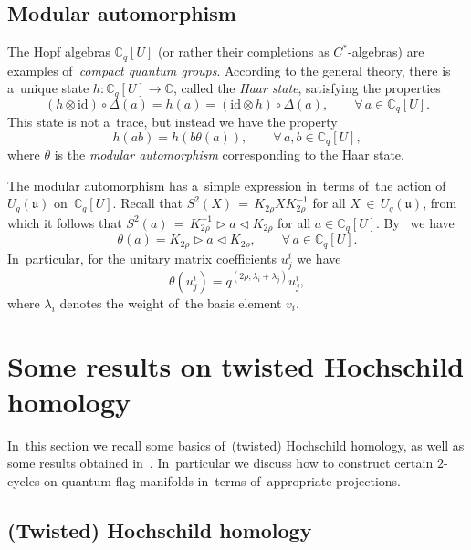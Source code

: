 \documentclass[10pt,a4paper]{amsart}
\numberwithin{equation}{section}
\newcommand{\Uqu}{U_q(\mathfrak{u})}
\newcommand{\CqU}{\mathbb{C}_q[U]}
\newcommand{\id}{\mathrm{id}}
\newcommand{\bbC}{\mathbb{C}}
\begin{document}
\subsection{Modular automorphism}

The Hopf algebras $\CqU$ (or rather their completions as $C^*$-algebras) are examples of~\emph{compact quantum groups}.
According to the general theory, there is a~unique state $h\colon \CqU \to \bbC$, called the \emph{Haar state}, satisfying the properties
\[
(h \otimes \id) \circ \Delta(a) = h(a) = (\id \otimes h) \circ \Delta(a), \qquad \forall\, a \in \CqU.
\]
This state is not a~trace, but instead we have the property
\[
h(a b) = h(b \theta(a)), \qquad \forall \, a, b \in \CqU,
\]
where $\theta$ is the \emph{modular automorphism} corresponding to the Haar state.

The modular automorphism has a~simple expression in~terms of~the action of~$\Uqu$ on~$\CqU$.
Recall that $S^2(X)\, {=}\, K_{2 \rho} X K_{2 \rho}^{-1}$ for all $X \,{\in}\, \Uqu$, from which it follows that $S^2(a)\,{ =}\,K_{2 \rho}^{-1} \triangleright a\triangleleft K_{2 \rho}$ for all $a \in \CqU$.
By~\cite[Chapter 11, Proposition~34]{klsc} we have
\[
\theta(a) = K_{2 \rho} \triangleright a \triangleleft K_{2 \rho}, \qquad \forall\, a \in \CqU.
\]
In~particular, for the unitary matrix coefficients $u^i_j$ we have
\[
\theta(u^i_j) = q^{(2 \rho, \lambda_i + \lambda_j)} u^i_j,
\]
where $\lambda_i$ denotes the weight of~the basis element $v_i$.

\section{Some results on twisted Hoch\-schild homology}
\label{sec:hochschild}

In~this section we recall some basics of~(twisted) Hoch\-schild homology, as well as some results obtained in~\cite{twist-hoch}.
In~particular we discuss how to construct certain $2$-cycles on quantum flag manifolds in~terms of~appropriate projections.

\subsection{(Twisted) Hoch\-schild homology}
\end{document}
